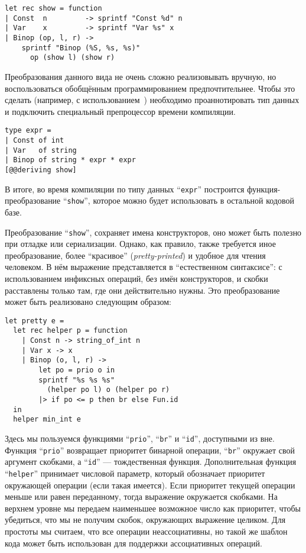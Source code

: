 \begin{lstlisting}
let rec show = function
| Const  n         -> sprintf "Const %d" n
| Var    x         -> sprintf "Var %s" x
| Binop (op, l, r) ->
    sprintf "Binop (%S, %s, %s)" 
      op (show l) (show r)
\end{lstlisting}

Преобразования данного вида не очень сложно реализовывать вручную, но воспользоваться обобщённым программированием предпочтительнее. Чтобы это сделать (например, с использованием~\cite{ppxderiving})  необходимо проаннотировать тип данных и подключить специальный препроцессор времени компиляции. 

\begin{lstlisting}
type expr =
| Const of int
| Var   of string
| Binop of string * expr * expr
[@@deriving show]
\end{lstlisting}

\noindent В итоге, во время компиляции по типу данных ``\lstinline{expr}'' построится функция-преобразование ``\lstinline{show}'', которое можно будет использовать в остальной кодовой базе.

Преобразование 
``\lstinline{show}'',
сохраняет имена конструкторов, оно может быть
полезно при отладке или сериализации. Однако, как правило, также требуется иное преобразование, более ``красивое'' (\emph{pretty-printed}) и удобное для чтения человеком. 
В нём выражение представляется в ``естественном синтаксисе'': с использованием инфиксных операций, без имён конструкторов, и скобки расставлены только там, где они действительно нужны. Это преобразование может быть реализовано следующим образом:

\begin{lstlisting}
let pretty e =
  let rec helper p = function
    | Const n -> string_of_int n
    | Var x -> x
    | Binop (o, l, r) ->
        let po = prio o in
        sprintf "%s %s %s" 
          (helper po l) o (helper po r)
        |> if po <= p then br else Fun.id 
  in
  helper min_int e
\end{lstlisting}

\noindent Здесь мы пользуемся функциями ``\lstinline{prio}'', ``\lstinline{br}'' и ``\lstinline{id}'', доступными из вне. Функция ``\lstinline{prio}''
возвращает приоритет бинарной операции, ``\lstinline{br}'' окружает свой аргумент скобками, а ``\lstinline{id}'' --- тождественная функция.
Дополнительная функция ``\lstinline{helper}'' принимает числовой параметр, который обозначает приоритет окружающей операции (если такая имеется). Если приоритет текущей операции меньше или равен переданному, тогда выражение окружается скобками. На верхнем уровне мы передаем наименьшее возможное число как приоритет, чтобы убедиться, что мы не получим скобок, окружающих выражение целиком. Для простоты мы считаем, что все операции неассоциативны, но такой же шаблон кода может быть использован для поддержки ассоциативных операций.

